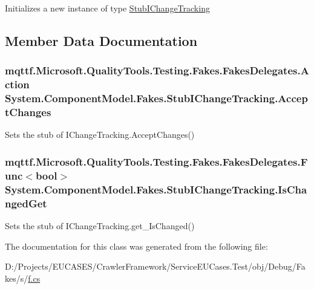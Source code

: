 Initializes a new instance of type \hyperlink{class_system_1_1_component_model_1_1_fakes_1_1_stub_i_change_tracking}{Stub\-I\-Change\-Tracking}



\subsection{Member Data Documentation}
\hypertarget{class_system_1_1_component_model_1_1_fakes_1_1_stub_i_change_tracking_abe187ec25d334677fb26812f431f8a0c}{
\subsubsection[{Accept\-Changes}]{\setlength{\rightskip}{0pt plus 5cm}mqttf.\-Microsoft.\-Quality\-Tools.\-Testing.\-Fakes.\-Fakes\-Delegates.\-Action System.\-Component\-Model.\-Fakes.\-Stub\-I\-Change\-Tracking.\-Accept\-Changes}}\label{class_system_1_1_component_model_1_1_fakes_1_1_stub_i_change_tracking_abe187ec25d334677fb26812f431f8a0c}


Sets the stub of I\-Change\-Tracking.\-Accept\-Changes()

\hypertarget{class_system_1_1_component_model_1_1_fakes_1_1_stub_i_change_tracking_adb8e29697e7406bc87c7c838acba4dd5}{
\subsubsection[{Is\-Changed\-Get}]{\setlength{\rightskip}{0pt plus 5cm}mqttf.\-Microsoft.\-Quality\-Tools.\-Testing.\-Fakes.\-Fakes\-Delegates.\-Func$<$bool$>$ System.\-Component\-Model.\-Fakes.\-Stub\-I\-Change\-Tracking.\-Is\-Changed\-Get}}\label{class_system_1_1_component_model_1_1_fakes_1_1_stub_i_change_tracking_adb8e29697e7406bc87c7c838acba4dd5}


Sets the stub of I\-Change\-Tracking.\-get\-\_\-\-Is\-Changed()



The documentation for this class was generated from the following file\-:\begin{DoxyCompactItemize}
\item 
D\-:/\-Projects/\-E\-U\-C\-A\-S\-E\-S/\-Crawler\-Framework/\-Service\-E\-U\-Cases.\-Test/obj/\-Debug/\-Fakes/s/\hyperlink{s_2f_8cs}{f.\-cs}\end{DoxyCompactItemize}

